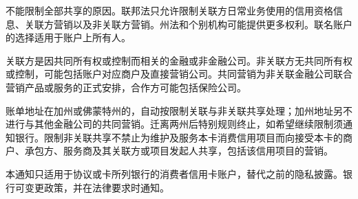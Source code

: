 \documentclass[UTF8,fontset=none,11pt,a4paper]{ctexart}
\begin{document}
不能限制全部共享的原因。联邦法只允许限制关联方日常业务使用的信用资格信息、关联方营销以及非关联方营销。州法和个别机构可能提供更多权利。联名账户的选择适用于账户上所有人。


关联方是因共同所有权或控制而相关的金融或非金融公司。非关联方无共同所有权或控制，可能包括账户对应商户及直接营销公司。共同营销为非关联金融公司联合营销产品或服务的正式安排，合作方可能包括保险公司。


账单地址在加州或佛蒙特州的，自动按限制关联与非关联共享处理；加州地址另不进行与其他金融公司的共同营销。迁离两州后特别规则终止，如希望继续限制须通知银行。限制非关联共享不禁止为维护及服务本卡消费信用项目而向接受本卡的商户、承包方、服务商及其关联方或项目发起人共享，包括该信用项目的营销。


本通知只适用于协议或卡所列银行的消费者信用卡账户，替代之前的隐私披露。银行可变更政策，并在法律要求时通知。
\end{document}
